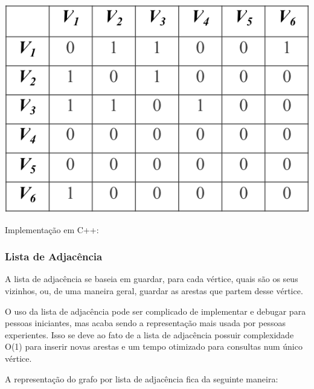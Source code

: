 \documentclass[a4paper,12pt]{article}
\begin{document}
\begin{center}
  \includegraphics[width=\linewidth/2]{figures/grafos/representacao_matriz_adj.png}
\end{center}

\noindent Implementação em C++:


\subsubsection{Lista de Adjacência}

\indent\indent A lista de adjacência se baseia em guardar, para cada vértice, quais são os seus vizinhos, ou, de uma maneira geral, guardar as arestas que partem desse vértice.

\indent O uso da lista de adjacência pode ser complicado de implementar e debugar para pessoas iniciantes, mas acaba sendo a representação mais usada por pessoas experientes. Isso se deve ao fato de a lista de adjacência possuir complexidade O(1) para inserir novas arestas e um tempo otimizado para consultas num único vértice.

\indent A representação do grafo por lista de adjacência fica da seguinte maneira:
\end{document}
